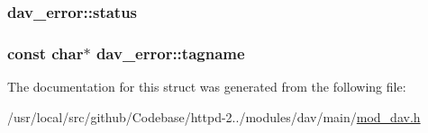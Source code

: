 \subsubsection[{\texorpdfstring{status}{status}}]{ dav\+\_\+error\+::status}\hypertarget{structdav__error_a128d24c8403fc5525e754f96700d4e41}{}\label{structdav__error_a128d24c8403fc5525e754f96700d4e41}
\subsubsection[{\texorpdfstring{tagname}{tagname}}]{\setlength{\rightskip}{0pt plus 5cm}const char$\ast$ dav\+\_\+error\+::tagname}\hypertarget{structdav__error_ae599c7a34410523fcb9acf056e3c0c15}{}\label{structdav__error_ae599c7a34410523fcb9acf056e3c0c15}


The documentation for this struct was generated from the following file\+:\begin{DoxyCompactItemize}
\item 
/usr/local/src/github/\+Codebase/httpd-\/2../modules/dav/main/\hyperlink{mod__dav_8h}{mod\+\_\+dav.\+h}\end{DoxyCompactItemize}
